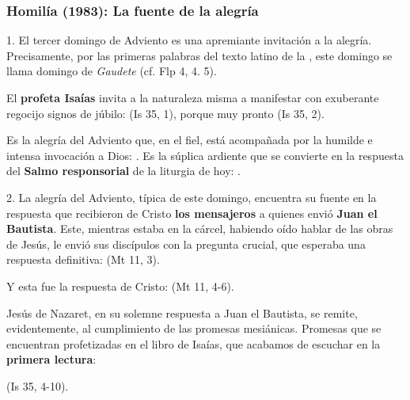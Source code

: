 			\subsubsection{Homilía (1983): La fuente de la alegría}
					\begin{body}
						1. El tercer domingo de Adviento es una apremiante invitación a la alegría. Precisamente, por las primeras palabras del texto latino de la , este domingo se llama domingo de \emph{Gaudete} (cf. Flp 4, 4. 5). 
						
						El \textbf{profeta Isaías} invita a la naturaleza misma a manifestar con exuberante regocijo signos de júbilo:  (Is 35, 1), porque muy pronto  (Is 35, 2).
						
						Es la alegría del Adviento que, en el fiel, está acompañada por la humilde e intensa invocación a Dios: . Es la súplica ardiente que se convierte en la respuesta del \textbf{Salmo responsorial} de la liturgia de hoy: .
						
						2. La alegría del Adviento, típica de este domingo, encuentra su fuente en la respuesta que recibieron de Cristo \textbf{los mensajeros} a quienes envió \textbf{Juan el Bautista}. Este, mientras estaba en la cárcel, habiendo oído hablar de las obras de Jesús, le envió sus discípulos con la pregunta crucial, que esperaba una respuesta definitiva:  (Mt 11, 3).
						
						Y esta fue la respuesta de Cristo:  (Mt 11, 4-6).
						
						Jesús de Nazaret, en su solemne respuesta a Juan el Bautista, se remite, evidentemente, al cumplimiento de las promesas mesiánicas. Promesas que se encuentran profetizadas en el libro de Isaías, que acabamos de escuchar en la \textbf{primera lectura}:
						
						 (Is 35, 4-10).
						

\end{body}
